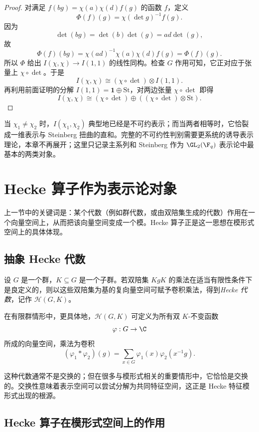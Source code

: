 \begin{proof}
对满足 $f(bg)=\chi(a)\chi(d)f(g)$ 的函数 $f$，定义
\[
\Phi(f)(g)=\chi(\det g)^{-1}f(g).
\]
因为
\[
\det(bg)=\det(b)\det(g)=ad\det(g),
\]
故
\[
\Phi(f)(bg)=\chi(ad)^{-1}\chi(a)\chi(d)f(g)=\Phi(f)(g).
\]
所以 $\Phi$ 给出 $I(\chi,\chi)\to I(1,1)$ 的线性同构。检查 $G$ 作用可知，它正对应于张量上 $\chi\circ\det$。于是
\[
I(\chi,\chi)\cong (\chi\circ\det)\otimes I(1,1).
\]
再利用前面证明的分解 $I(1,1)=\mathbf{1}\oplus \mathrm{St}$，对两边张量 $\chi\circ\det$ 即得
\[
I(\chi,\chi)\cong (\chi\circ\det)\oplus ((\chi\circ\det)\otimes \mathrm{St}).
\]
\end{proof}

\begin{remark}
当 $\chi_1\neq \chi_2$ 时，$I(\chi_1,\chi_2)$ 典型地已经是不可约表示；而当两者相等时，它恰裂成一维表示与 Steinberg 扭曲的直和。完整的不可约性判别需要更系统的诱导表示理论，本章不再展开；这里只记录主系列和 Steinberg 作为 $\GL_2(\F_q)$ 表示论中最基本的两类对象。
\end{remark}

\section{Hecke 算子作为表示论对象}

上一节中的关键词是：某个代数（例如群代数，或由双陪集生成的代数）作用在一个向量空间上，从而把该向量空间变成一个模。Hecke 算子正是这一思想在模形式空间上的具体体现。

\subsection*{抽象 Hecke 代数}

\begin{definition}
设 $G$ 是一个群，$K\subseteq G$ 是一个子群。若双陪集 $KgK$ 的乘法在适当有限性条件下是良定义的，则以这些双陪集为基的复向量空间可赋予卷积乘法，得到\emph{Hecke 代数}，记作 $\mathcal{H}(G,K)$。

在有限群情形中，更具体地，$\mathcal{H}(G,K)$ 可定义为所有双 $K$-不变函数
\[
\varphi:G\to \C
\]
所成的向量空间，乘法为卷积
\[
(\varphi_1*\varphi_2)(g)=\sum_{x\in G}\varphi_1(x)\varphi_2(x^{-1}g).
\]
\end{definition}

这种代数通常不是交换的；但在很多与模形式相关的重要情形中，它恰恰是交换的。交换性意味着表示空间可以尝试分解为共同特征空间，这正是 Hecke 特征模形式出现的根源。

\subsection*{Hecke 算子在模形式空间上的作用}

